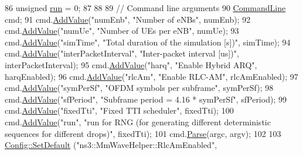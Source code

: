 \begin{DoxyCode}
86         \textcolor{keywordtype}{unsigned} \hyperlink{generate__test__data__lte__spectrum__value__txpsd_8m_a093eaf8ac95b223aafb28e4668160d1f}{run} = 0;
87 
88 
89         \textcolor{comment}{// Command line arguments}
90         \hyperlink{classns3_1_1CommandLine}{CommandLine} cmd;
91         cmd.\hyperlink{classns3_1_1CommandLine_addcfb546c7ad4c8bd0965654d55beb8e}{AddValue}(\textcolor{stringliteral}{"numEnb"}, \textcolor{stringliteral}{"Number of eNBs"}, numEnb);
92         cmd.\hyperlink{classns3_1_1CommandLine_addcfb546c7ad4c8bd0965654d55beb8e}{AddValue}(\textcolor{stringliteral}{"numUe"}, \textcolor{stringliteral}{"Number of UEs per eNB"}, numUe);
93         cmd.\hyperlink{classns3_1_1CommandLine_addcfb546c7ad4c8bd0965654d55beb8e}{AddValue}(\textcolor{stringliteral}{"simTime"}, \textcolor{stringliteral}{"Total duration of the simulation [s])"}, simTime);
94         cmd.\hyperlink{classns3_1_1CommandLine_addcfb546c7ad4c8bd0965654d55beb8e}{AddValue}(\textcolor{stringliteral}{"interPacketInterval"}, \textcolor{stringliteral}{"Inter-packet interval [us])"}, interPacketInterval);
95         cmd.\hyperlink{classns3_1_1CommandLine_addcfb546c7ad4c8bd0965654d55beb8e}{AddValue}(\textcolor{stringliteral}{"harq"}, \textcolor{stringliteral}{"Enable Hybrid ARQ"}, harqEnabled);
96         cmd.\hyperlink{classns3_1_1CommandLine_addcfb546c7ad4c8bd0965654d55beb8e}{AddValue}(\textcolor{stringliteral}{"rlcAm"}, \textcolor{stringliteral}{"Enable RLC-AM"}, rlcAmEnabled);
97         cmd.\hyperlink{classns3_1_1CommandLine_addcfb546c7ad4c8bd0965654d55beb8e}{AddValue}(\textcolor{stringliteral}{"symPerSf"}, \textcolor{stringliteral}{"OFDM symbols per subframe"}, symPerSf);
98         cmd.\hyperlink{classns3_1_1CommandLine_addcfb546c7ad4c8bd0965654d55beb8e}{AddValue}(\textcolor{stringliteral}{"sfPeriod"}, \textcolor{stringliteral}{"Subframe period = 4.16 * symPerSf"}, sfPeriod);
99         cmd.\hyperlink{classns3_1_1CommandLine_addcfb546c7ad4c8bd0965654d55beb8e}{AddValue}(\textcolor{stringliteral}{"fixedTti"}, \textcolor{stringliteral}{"Fixed TTI scheduler"}, fixedTti);
100         cmd.\hyperlink{classns3_1_1CommandLine_addcfb546c7ad4c8bd0965654d55beb8e}{AddValue}(\textcolor{stringliteral}{"run"}, \textcolor{stringliteral}{"run for RNG (for generating different deterministic sequences for
       different drops)"}, fixedTti);
101         cmd.\hyperlink{classns3_1_1CommandLine_a5c10b85b3207e5ecb48d907966923156}{Parse}(argc, argv);
102 
103         \hyperlink{group__config_ga2e7882df849d8ba4aaad31c934c40c06}{Config::SetDefault} (\textcolor{stringliteral}{"ns3::MmWaveHelper::RlcAmEnabled"}, 

\end{DoxyCode}
